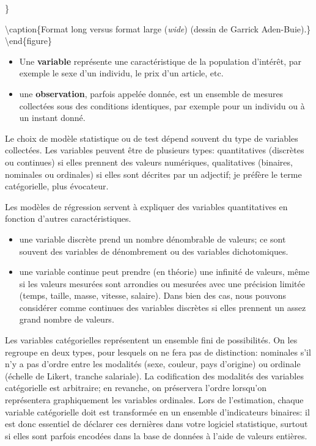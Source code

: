 \documentclass[
  11pt,
  letterpaper,
]{article}
\providecommand{\tightlist}{%
  \setlength{\itemsep}{0pt}\setlength{\parskip}{0pt}}
\theoremstyle{definition}
\theoremstyle{definition}
\theoremstyle{definition}
\theoremstyle{remark}
\begin{document}
\}

\textbackslash caption\{Format long versus format large (\emph{wide}) (dessin de Garrick Aden-Buie).\}\label{fig:longvswide}
\textbackslash end\{figure\}

\begin{itemize}
\tightlist
\item
  Une \textbf{variable} représente une caractéristique de la population d'intérêt, par exemple le sexe d'un individu, le prix d'un article, etc.
\item
  une \textbf{observation}, parfois appelée donnée, est un ensemble de mesures collectées sous des conditions identiques, par exemple pour un individu ou à un instant donné.
\end{itemize}

Le choix de modèle statistique ou de test dépend souvent du type de variables collectées. Les variables peuvent être de plusieurs types: quantitatives (discrètes ou continues) si elles prennent des valeurs numériques, qualitatives (binaires, nominales ou ordinales) si elles sont décrites par un adjectif; je préfère le terme catégorielle, plus évocateur.

Les modèles de régression servent à expliquer des variables quantitatives en fonction d'autres caractéristiques.

\begin{itemize}
\tightlist
\item
  une variable discrète prend un nombre dénombrable de valeurs; ce sont souvent des variables de dénombrement ou des variables dichotomiques.
\item
  une variable continue peut prendre (en théorie) une infinité de valeurs, même si les valeurs mesurées sont arrondies ou mesurées avec une précision limitée (temps, taille, masse, vitesse, salaire). Dans bien des cas, nous pouvons considérer comme continues des variables discrètes si elles prennent un assez grand nombre de valeurs.
\end{itemize}

Les variables catégorielles représentent un ensemble fini de possibilités. On les regroupe en deux types, pour lesquels on ne fera pas de distinction: nominales s'il n'y a pas d'ordre entre les modalités (sexe, couleur, pays d'origine) ou ordinale (échelle de Likert, tranche salariale). La codification des modalités des variables catégorielle est arbitraire; en revanche, on préservera l'ordre lorsqu'on représentera graphiquement les variables ordinales. Lors de l'estimation, chaque variable catégorielle doit est transformée en un ensemble d'indicateurs binaires: il est donc essentiel de déclarer ces dernières dans votre logiciel statistique, surtout si elles sont parfois encodées dans la base de données à l'aide de valeurs entières.
\end{document}
